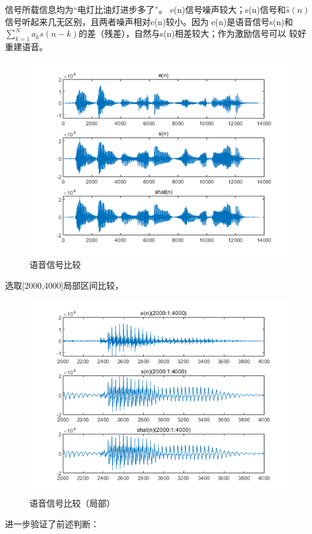 \documentclass[10pt]{article}
\begin{document}
信号所载信息均为“电灯比油灯进步多了”。
e(n)信号噪声较大；s(n)信号和$\hat{s}(n)$信号听起来几无区别，且两者噪声相对e(n)较小。因为
e(n)是语音信号s(n)和$\sum_{k=1}^{N}a_ks(n-k)$的差（残差），自然与s(n)相差较大；作为激励信号可以
较好重建语音。
\begin{figure}[h]
	\centering
	\begin{minipage}{0.49\linewidth}
		\centering
		\includegraphics[width=0.9\linewidth]{compare.png}
		\caption{语音信号比较}
	\end{minipage}
\end{figure}

选取[2000,4000]局部区间比较，
\begin{figure}[h]
	\centering
	\begin{minipage}{0.49\linewidth}
		\centering
		\includegraphics[width=0.9\linewidth]{commpare.png}
		\caption{语音信号比较（局部）}
	\end{minipage}
\end{figure}
进一步验证了前述判断：
\end{document}
